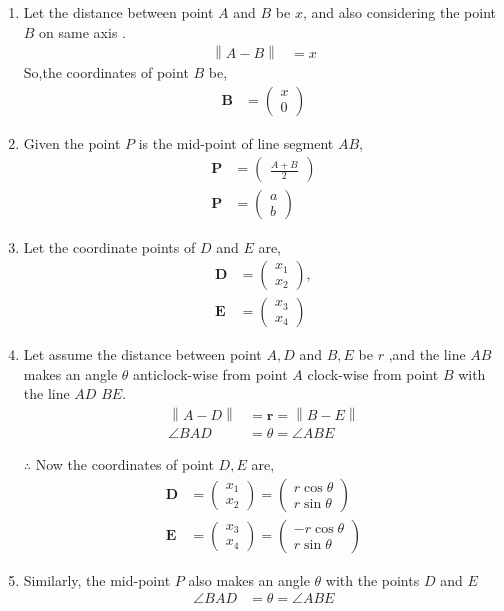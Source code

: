\documentclass[11pt, a4paper]{article}
\newcommand{\myvec}[1]{\ensuremath{\begin{pmatrix}#1\end{pmatrix}}}
\let\vec\mathbf
\providecommand{\norm}[1]{\left\lVert#1\right\rVert}
\begin{document}
\begin{enumerate}
\begin{enumerate}[label=(\roman*)]
\item Let the distance between point $A$ and $B$ be $x$, and also considering the point $B$ on same axis .
\begin{align}
	\norm{A-B} &= x
\end{align}
 So,the coordinates of point $B$ be,
\begin{align}
\vec{B} &= \myvec{x \\ 0}
\end{align}

\item Given the point $P$ is the mid-point of line segment $AB$,
\begin{align}
	\vec{P} &= \myvec{\frac{A+B}{2}}\\
	\vec{P} &= \myvec{a \\ b}
\end{align}

\item Let the coordinate points of $D$ and $E$ are,
\begin{align}
\vec{D} &= \myvec{ x_1 \\ x_2},\\
\vec{E} &= \myvec{ x_3 \\ x_4}
\end{align}

\item Let assume the distance between point $A, D$ and $B, E$ be $r$ ,and the line $AB$ makes an angle $ \theta $ anticlock-wise from point $A$ clock-wise from point $B$ with the line $AD$ $BE$.
\begin{align}
	\norm{A-D} &= \vec{r} = \norm{B-E} \\
	\angle BAD &= \theta = \angle ABE
\end{align}

$\therefore$ Now the coordinates of point $D, E$ are,
\begin{align}
	\vec{D} &= \myvec{ x_1 \\ x_2 } = \myvec{r \cos \theta \\ r\sin \theta} \\
	\vec{E} &= \myvec{ x_3 \\ x_4 } = \myvec{-r \cos \theta \\ r \sin \theta} 
\end{align}

\item Similarly, the mid-point $P$ also makes an angle $\theta$ with the points $D$ and $E$
	\begin{align}
		\angle BAD &= \theta = \angle ABE
	\end{align}


\end{enumerate}
\end{enumerate}
\end{document}
